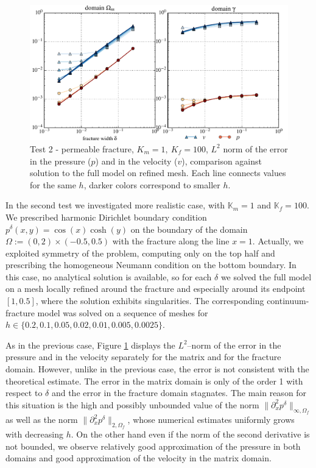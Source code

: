 \documentclass{llncs}
\def\prtl{\partial}
\def\tn#1{{\mathbb{#1}}}    %
\def\norm#1{\|#1\|}
\begin{document}
\begin{figure}
\centering
\includegraphics[scale=0.6]{figures/plot_num_cos_cosh_color.pdf}
\caption{Test 2 - permeable fracture, $K_m=1,\ K_f=100$, $L^2$ norm of the error in the pressure ($p$) and in the velocity ($v$), 
         comparison against solution to the full model on refined mesh.
         Each line connects values for the same $h$, darker colors correspond to smaller $h$.}
\label{fig:cos_cosh}
\end{figure}


In the second test we investigated more realistic case, with $\tn K_m=1$ and $\tn K_f=100$. We prescribed harmonic Dirichlet boundary condition 
$p^\delta(x,y) = \cos(x)\cosh(y)$ on the boundary of the domain $\Omega:=(0,2)\times(-0.5,0.5)$ with the fracture along the line $x=1$.
Actually, we exploited symmetry of the problem, computing only on the top half and prescribing the homogeneous 
Neumann condition on the bottom boundary. In this case, no analytical solution is available, so for each $\delta$
we solved the full model on a mesh locally refined 
around the fracture and especially around its endpoint $[1, 0.5]$, where the solution exhibits singularities.
The corresponding continuum-fracture model was solved 
on a sequence of meshes for $h\in\{0.2, 0.1, 0.05, 0.02, 0.01, 0.005, 0.0025\}$.

As in the previous case, Figure \ref{fig:cos_cosh} displays the $L^2$--norm of the error in the pressure and in the velocity separately for 
the matrix and for the fracture domain. However, unlike in the previous case, the error is not consistent with the theoretical estimate. 
The error in the matrix domain is only of the order 1 with respect to $\delta$ and the error in the fracture domain stagnates.
The main reason for this situation is the high and possibly unbounded value of the norm 
$\norm{\prtl^2_x p^\delta}_{\infty,\Omega_f}$
as well as the norm $\norm{\prtl^2_x p^\delta}_{2,\Omega_f}$,
whose numerical estimates uniformly grows with decreasing $h$.
On the other hand even if the norm of the second derivative is not bounded, we observe relatively good approximation of the pressure in both domains
and good approximation of the velocity in the matrix domain.
\end{document}

